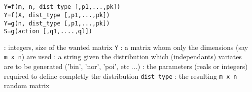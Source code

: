 
\begin{mandesc}
   \\
   \\
\end{mandesc}

\begin{calling_sequence}
\begin{verbatim}
Y=f(m, n, dist_type [,p1,...,pk])  
Y=f(X, dist_type [,p1,...,pk])  
Y=g(n, dist_type [,p1,...,pk])  
S=g(action [,q1,....,ql])  
\end{verbatim}
\end{calling_sequence}
\begin{parameters}
  \begin{varlist}
    : integers, size of the wanted matrix \verb!Y!
    : a matrix whom only the dimensions (say \verb!m x n!) are used
    : a string given the distribution which (independants) variates are to be 
    generated ('bin', 'nor', 'poi', etc ...)
    : the parameters (reals or integers) required to define completly the distribution 
    \verb!dist_type!
    : the resulting \verb!m x n! random matrix
  \end{varlist}
\end{parameters}

